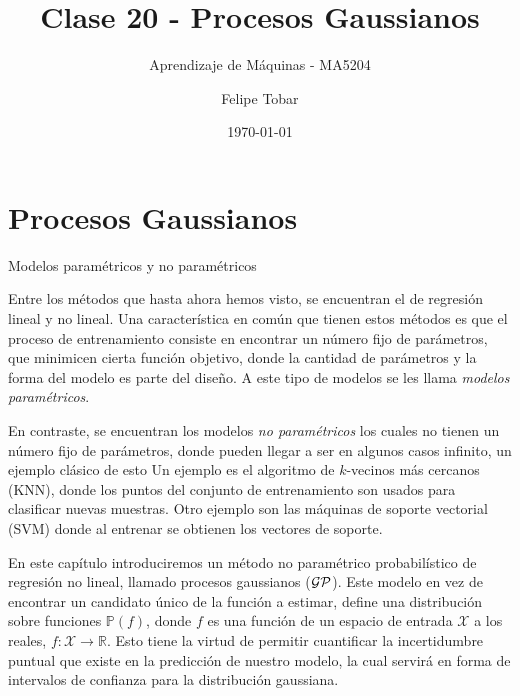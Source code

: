 \documentclass[9pt]{beamer}
\title{Clase 20 - Procesos Gaussianos}
\subtitle{Aprendizaje de Máquinas - MA5204}
\date{\today}
\author{Felipe Tobar}
\institute{Department of Mathematical Engineering \&\\ Center for Mathematical Modelling\\Universidad de Chile}
\begin{document}
\begin{frame}
  \titlepage
\end{frame}

\section{Procesos Gaussianos}

\begin{frame}{Modelos paramétricos y no paramétricos}

Entre los métodos que hasta ahora hemos visto, se encuentran el de regresión lineal y no lineal. Una característica en común que tienen estos métodos es que el proceso de entrenamiento consiste en encontrar un número fijo de parámetros, que minimicen cierta función objetivo, donde la cantidad de parámetros y la forma del modelo es parte del diseño. A este tipo de modelos se les llama \textit{modelos paramétricos}. \pause
\vspace{0.2cm} 

En contraste, se encuentran los modelos \textit{no paramétricos} los cuales no tienen un número fijo de parámetros, donde pueden llegar a ser en algunos casos infinito, un ejemplo clásico de esto  Un ejemplo es el algoritmo de $k$-vecinos más cercanos (KNN), donde los puntos del conjunto de entrenamiento son usados para clasificar nuevas muestras. Otro ejemplo son las máquinas de soporte vectorial (SVM) donde al entrenar se obtienen los vectores de soporte. \pause 
\vspace{0.2cm} 

En este capítulo introduciremos un método no paramétrico probabilístico de regresión no lineal, llamado procesos gaussianos ($\mathcal{GP}$). Este modelo en vez de encontrar un candidato único de la función a estimar, define una distribución sobre funciones $\mathbb{P}(f)$, donde $f$ es una función de un espacio de entrada $\mathcal{X}$ a los reales, $f: \mathcal{X} \rightarrow \mathbb{R}$. Esto tiene la virtud de permitir cuantificar la incertidumbre puntual que existe en la predicción de nuestro modelo, la cual servirá en forma de intervalos de confianza para la distribución gaussiana.

\end{frame}
\end{document}
